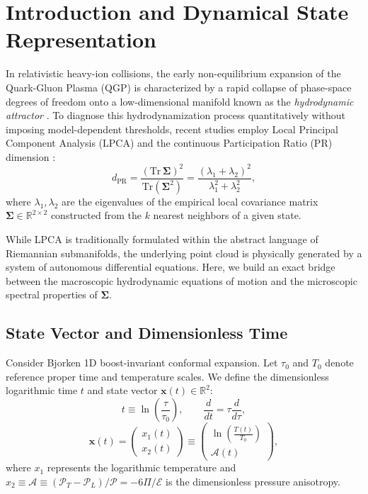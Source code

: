 \documentclass[11pt,a4paper]{article}
\begin{document}
\section{Introduction and Dynamical State Representation}
\label{sec:dynamical_state}
In relativistic heavy-ion collisions, the early non-equilibrium expansion of the Quark-Gluon Plasma (QGP) is characterized by a rapid collapse of phase-space degrees of freedom onto a low-dimensional manifold known as the \emph{hydrodynamic attractor} \cite{Heller2015,Romatschke2017,Spalinski2016}. To diagnose this hydrodynamization process quantitatively without imposing model-dependent thresholds, recent studies employ Local Principal Component Analysis (LPCA) and the continuous Participation Ratio (PR) dimension \cite{Campadelli2015,LittleMaggioni2009}:
\begin{equation}
    d_{\mathrm{PR}} = \frac{\left(\mathrm{Tr}\,\mathbf{\Sigma}\right)^2}{\mathrm{Tr}\left(\mathbf{\Sigma}^2\right)} = \frac{\left(\lambda_1 + \lambda_2\right)^2}{\lambda_1^2 + \lambda_2^2},
    \label{eq:d_pr_definition}
\end{equation}
where $\lambda_1, \lambda_2$ are the eigenvalues of the empirical local covariance matrix $\mathbf{\Sigma} \in \mathbb{R}^{2 \times 2}$ constructed from the $k$ nearest neighbors of a given state.

While LPCA is traditionally formulated within the abstract language of Riemannian submanifolds, the underlying point cloud is physically generated by a system of autonomous differential equations. Here, we build an exact bridge between the macroscopic hydrodynamic equations of motion and the microscopic spectral properties of $\mathbf{\Sigma}$.

\subsection{State Vector and Dimensionless Time}
Consider Bjorken 1D boost-invariant conformal expansion. Let $\tau_0$ and $T_0$ denote reference proper time and temperature scales. We define the dimensionless logarithmic time $t$ and state vector $\mathbf{x}(t) \in \mathbb{R}^2$:
\begin{equation}
    t \equiv \ln\left(\frac{\tau}{\tau_0}\right), \qquad \frac{d}{dt} = \tau \frac{d}{d\tau},
\end{equation}
\begin{equation}
    \mathbf{x}(t) = \begin{pmatrix} x_1(t) \\ x_2(t) \end{pmatrix} \equiv \begin{pmatrix} \ln\left(\frac{T(t)}{T_0}\right) \\ \mathcal{A}(t) \end{pmatrix},
    \label{eq:state_vector}
\end{equation}
where $x_1$ represents the logarithmic temperature and $x_2 \equiv \mathcal{A} \equiv (\mathcal{P}_T - \mathcal{P}_L)/\mathcal{P} = -6\Pi/\mathcal{E}$ is the dimensionless pressure anisotropy.
\end{document}

